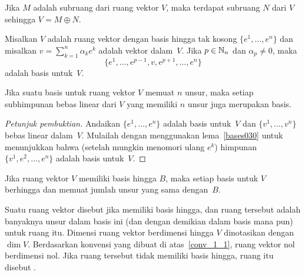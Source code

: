 \begin{prop}\label{0000824} Jika $M$ adalah subruang dari ruang vektor $V$, maka terdapat subruang $N$ dari
$V$ sehingga $V = M \oplus N$.
\end{prop}

\begin{lem}\label{bases030} Misalkan $V$ adalah ruang vektor dengan basis hingga tak kosong $\{e^1,
\dots,e^n\}$ dan misalkan $v = \sum_{k=1}^n \alpha_k e^k$ adalah vektor dalam~$V$. Jika $p \in \mathbb{N}_n$
dan $\alpha_p \ne 0$, maka
\[
\{e^1, \dots,e^{p-1},v,e^{p+1}, \dots, e^n\}
\]
adalah basis untuk~$V$.
\end{lem}

\begin{prop}\label{bases031} Jika suatu basis untuk ruang vektor $V$ memuat $n$ unsur,
maka setiap subhimpunan bebas linear dari $V$ yang memiliki $n$ unsur juga merupakan basis.
\end{prop}

\begin{proof}[\emph{Petunjuk pembuktian}] Andaikan $\{e^1,\dots,e^n\}$ adalah basis untuk~$V$ dan
$\{v^1, \dots,v^n\}$ bebas linear dalam~$V$. Mulailah dengan menggunakan lema~\ref{bases030}
untuk menunjukkan bahwa (setelah mungkin menomori ulang $e^k$) himpunan $\{v^1, e^2, \dots, e^n\}$
adalah basis untuk~$V$.  \ns
\end{proof}

\begin{cor}\label{bases032} Jika ruang vektor $V$ memiliki basis hingga $B$, maka setiap basis
untuk $V$ berhingga dan memuat jumlah unsur yang sama dengan~$B$.
\end{cor}

\begin{defn} Suatu ruang vektor disebut
 jika memiliki basis hingga, dan
 ruang tersebut adalah banyaknya unsur dalam basis ini (dan dengan demikian dalam basis mana pun) untuk
ruang itu. Dimensi ruang vektor berdimensi hingga $V$ dinotasikan dengan $\dim V$. Berdasarkan
konvensi yang dibuat di atas~\ref{conv_1_1}, ruang vektor nol berdimensi nol. Jika
ruang tersebut tidak memiliki basis hingga, ruang itu disebut
.
\end{defn}

